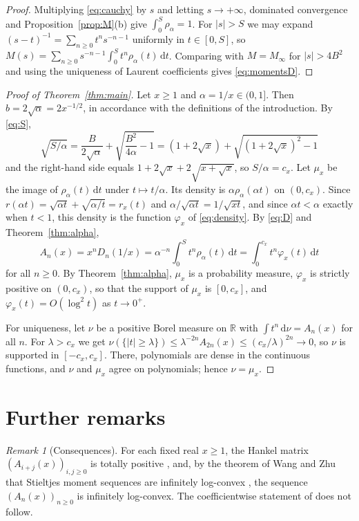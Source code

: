 \documentclass[11pt]{amsart}
\numberwithin{equation}{section}
\theoremstyle{definition}
\theoremstyle{remark}
\newtheorem{remark}[theorem]{Remark}
\newcommand{\R}{\mathbb{R}}
\newcommand{\dd}{\,\mathrm{d}}
\begin{document}
\begin{proof}
Multiplying \eqref{eq:cauchy} by $s$ and letting $s\to+\infty$, dominated
convergence and Proposition~\ref{prop:M}(b) give $\int_0^S\rho_\alpha=1$. For
$|s|>S$ we may expand $(s-t)^{-1}=\sum_{n\ge0}t^ns^{-n-1}$ uniformly in
$t\in[0,S]$, so $M(s)=\sum_{n\ge0}s^{-n-1}\int_0^St^n\rho_\alpha(t)\dd t$.
Comparing with $M=M_\infty$ for $|s|>4B^2$ and using the uniqueness of
Laurent coefficients gives \eqref{eq:momentsD}.
\end{proof}

\begin{proof}[Proof of Theorem~\ref{thm:main}]
Let $x\ge1$ and $\alpha=1/x\in(0,1]$. Then $b=2\sqrt\alpha=2x^{-1/2}$, in
accordance with the definitions of the introduction. By \eqref{eq:S},
\[
\sqrt{S/\alpha}=\frac{B}{2\sqrt\alpha}+\sqrt{\frac{B^2}{4\alpha}-1}
=(1+2\sqrt x)+\sqrt{(1+2\sqrt x)^2-1}
\]
and the right-hand side equals $1+2\sqrt x+2\sqrt{x+\sqrt x}$,
so $S/\alpha=c_x$. Let $\mu_x$ be the image of $\rho_\alpha(t)\dd t$ under
$t\mapsto t/\alpha$. Its density is $\alpha\rho_\alpha(\alpha t)$ on
$(0,c_x)$. Since $r(\alpha t)=\sqrt{\alpha t}+\sqrt{\alpha/t}=r_x(t)$ and
$\alpha/\sqrt{\alpha t}=1/\sqrt{xt}$, and since $\alpha t<\alpha$ exactly when
$t<1$, this density is the function $\varphi_x$ of \eqref{eq:density}. By
\eqref{eq:D} and Theorem~\ref{thm:alpha},
\[
A_n(x)=x^nD_n(1/x)=\alpha^{-n}\int_0^St^n\rho_\alpha(t)\dd t
=\int_0^{c_x}t^n\varphi_x(t)\dd t
\]
for all $n\ge0$. By Theorem~\ref{thm:alpha}, $\mu_x$ is a probability
measure, $\varphi_x$ is strictly positive on $(0,c_x)$, so that the support of
$\mu_x$ is $[0,c_x]$, and $\varphi_x(t)=O(\log^2t)$ as $t\to0^+$.

For uniqueness, let $\nu$ be a positive Borel measure on $\R$ with
$\int t^n\dd\nu=A_n(x)$ for all $n$. For $\lambda>c_x$ we get
$\nu(\{|t|\ge\lambda\})\le\lambda^{-2n}A_{2n}(x)\le(c_x/\lambda)^{2n}\to0$,
so $\nu$ is supported in $[-c_x,c_x]$. There, polynomials are dense in the
continuous functions, and $\nu$ and $\mu_x$ agree on polynomials; hence
$\nu=\mu_x$.
\end{proof}

\section{Further remarks}\label{sec:remarks}

\begin{remark}[Consequences]
For each fixed real $x\ge1$, the Hankel matrix $(A_{i+j}(x))_{i,j\ge0}$ is
totally positive \cite{WZ}, and, by the theorem of Wang and Zhu that
Stieltjes moment sequences are infinitely log-convex \cite{WZ}, the sequence
$(A_n(x))_{n\ge0}$ is infinitely log-convex. The coefficientwise statement
of \cite[Conjecture~2]{So25} does not follow.
\end{remark}
\end{document}
